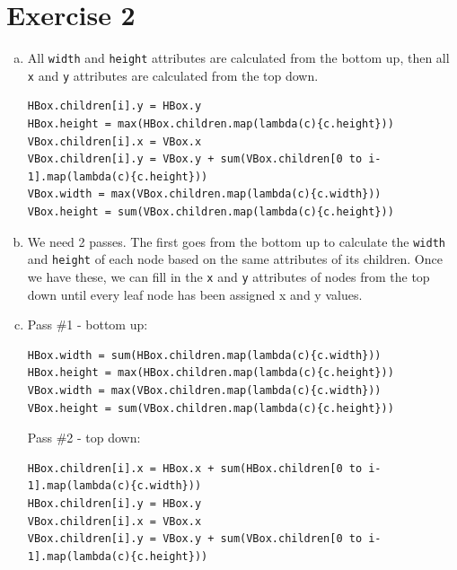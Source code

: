 \documentclass[11pt]{article}
\begin{document}
\section*{Exercise 2}
\begin{enumerate}[(a)]
\item All \texttt{width} and \texttt{height} attributes are calculated from the bottom up, then all \texttt{x} and \texttt{y} attributes are calculated from the top down. \begin{verbatim}
HBox.children[i].y = HBox.y
HBox.height = max(HBox.children.map(lambda(c){c.height}))
VBox.children[i].x = VBox.x
VBox.children[i].y = VBox.y + sum(VBox.children[0 to i-1].map(lambda(c){c.height}))
VBox.width = max(VBox.children.map(lambda(c){c.width}))
VBox.height = sum(VBox.children.map(lambda(c){c.height}))
\end{verbatim}
\item We need 2 passes. The first goes from the bottom up to calculate the \texttt{width} and \texttt{height} of each node based on the same attributes of its children. Once we have these, we can fill in the \texttt{x} and \texttt{y} attributes of nodes from the top down until every leaf node has been assigned x and y values.
\item Pass \#1 - bottom up: \begin{verbatim}
HBox.width = sum(HBox.children.map(lambda(c){c.width}))
HBox.height = max(HBox.children.map(lambda(c){c.height}))
VBox.width = max(VBox.children.map(lambda(c){c.width}))
VBox.height = sum(VBox.children.map(lambda(c){c.height}))
\end{verbatim}
Pass \#2 - top down: \begin{verbatim}
HBox.children[i].x = HBox.x + sum(HBox.children[0 to i-1].map(lambda(c){c.width}))
HBox.children[i].y = HBox.y
VBox.children[i].x = VBox.x
VBox.children[i].y = VBox.y + sum(VBox.children[0 to i-1].map(lambda(c){c.height}))
\end{verbatim}
\end{enumerate}


\newpage
\end{document}
